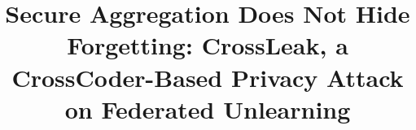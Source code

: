 \documentclass[conference]{IEEEtran}
\begin{document}
\title{ Secure Aggregation Does Not Hide Forgetting: CrossLeak, a CrossCoder-Based Privacy Attack on Federated Unlearning
}

\end{document}
